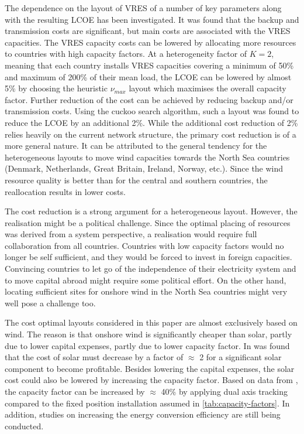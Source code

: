 \documentclass[a4paper, 12pt, sort&compress]{elsarticle}%
\begin{document}
The dependence on the layout of VRES of a number of key parameters
along with the resulting LCOE has been investigated. It was found that
the backup and transmission costs are significant, but main costs are
associated with the VRES capacities. The VRES capacity costs can be
lowered by allocating more resources to countries with high capacity
factors. At a heterogeneity factor of $K = 2$, meaning that each
country installs VRES capacities covering a minimum of 50\% and
maximum of 200\% of their mean load, the LCOE can be lowered by almost
5\% by choosing the heuristic $\nu_{max}$ layout which maximises the
overall capacity factor. Further reduction of the cost can be achieved
by reducing backup and/or transmission costs. Using the cuckoo search
algorithm, such a layout was found to reduce the LCOE by an additional
2\%. While the additional cost reduction of 2\% relies heavily on the
current network structure, the primary cost reduction is of a more
general nature. It can be attributed to the general tendency for the
heterogeneous layouts to move wind capacities towards the North Sea
countries (Denmark, Netherlands, Great Britain, Ireland, Norway,
etc.). Since the wind resource quality is better than for the central
and southern countries, the reallocation results in lower costs.


The cost reduction is a strong argument for a heterogeneous
layout. However, the realisation might be a political challenge. Since
the optimal placing of resources was derived from a system
perspective, a realisation would require full collaboration from all
countries. Countries with low capacity factors would no longer be self
sufficient, and they would be forced to invest in foreign
capacities. Convincing countries to let go of the independence of
their electricity system and to move capital abroad might require some
political effort. On the other hand, locating sufficient sites for
onshore wind in the North Sea countries might very well pose a
challenge too.

The cost optimal layouts considered in this paper are almost
exclusively based on wind. The reason is that onshore wind is
significantly cheaper than solar, partly due to lower capital
expenses, partly due to lower capacity factor. In was found that the
cost of solar must decrease by a factor of $\approx$ 2 for a
significant solar component to become profitable. Besides lowering the
capital expenses, the solar cost could also be lowered by increasing
the capacity factor. Based on data from \cite{REA}, the capacity factor can
be increased by $\approx$ 40\% by applying dual axis tracking compared
to the fixed position installation assumed in
\cref{tab:capacity-factors}. In addition, studies on increasing the
energy conversion efficiency are still being conducted.
\end{document}
